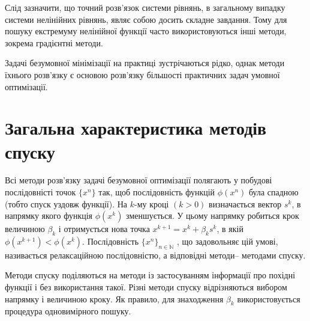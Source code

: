 Слід зазначити, що точний розв’язок системи рівнянь, в загальному випадку системи нелінійних рівнянь, являє собою досить складне завдання. Тому для пошуку екстремуму нелінійної функції часто використовуються інші методи, зокрема градієнтні методи.

Задачі безумовної мінімізації на практиці зустрічаються рідко, однак методи їхнього розв’язку є основою розв’язку більшості практичних задач умовної оптимізації.

\section {Загальна характеристика методів спуску}

Всі методи розв'язку задачі безумовної оптимізації полягають у побудові послідовністі точок $\{x^n\}$ так, щоб послідовність функцій $\phi(x^n)$ була спадною (тобто спуск уздовж функції). На $k$-му кроці $(k > 0)$ визначається вектор $s^k$, в напрямку якого функція $\phi(x^k)$ зменшується. У цьому напрямку робиться крок величиною $\beta_k$ і отримується нова точка
$x^{k+1} = x^k + \beta_ks^k$, в якій $\phi(x^{k+1}) < \phi(x^k)$. Послідовність $\{x^n\}_{n \in \mathbb{N}}$ , що задовольняє цій умові, називається релаксаційною послідовністю, а відповідні методи– методами спуску.

 Методи спуску поділяються на методи із застосуванням інформації про похідні функції і без використання такої. Різні методи спуску відрізняються вибором напрямку і величиною кроку. Як правило, для знаходження $\beta_k$ використовується процедура одновимірного пошуку.

